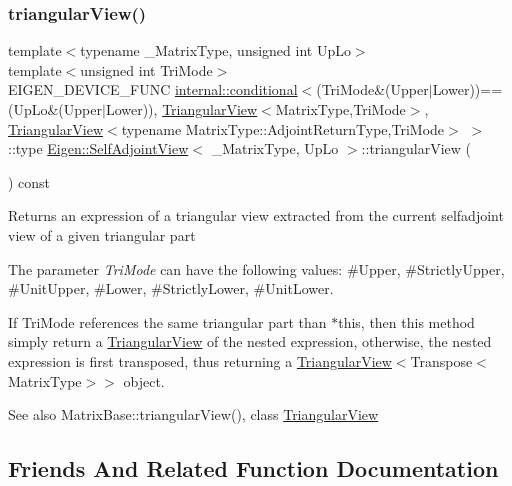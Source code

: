 \subsubsection{\texorpdfstring{triangularView()}{triangularView()}}
{\footnotesize\ttfamily template$<$typename \+\_\+\+Matrix\+Type, unsigned int Up\+Lo$>$ \\
template$<$unsigned int Tri\+Mode$>$ \\
E\+I\+G\+E\+N\+\_\+\+D\+E\+V\+I\+C\+E\+\_\+\+F\+U\+NC \mbox{\hyperlink{struct_eigen_1_1internal_1_1conditional}{internal\+::conditional}}$<$(Tri\+Mode\&(Upper$\vert$Lower))==(Up\+Lo\&(Upper$\vert$Lower)), \mbox{\hyperlink{class_eigen_1_1_triangular_view}{Triangular\+View}}$<$Matrix\+Type,Tri\+Mode$>$, \mbox{\hyperlink{class_eigen_1_1_triangular_view}{Triangular\+View}}$<$typename Matrix\+Type\+::\+Adjoint\+Return\+Type,Tri\+Mode$>$ $>$\+::type \mbox{\hyperlink{class_eigen_1_1_self_adjoint_view}{Eigen\+::\+Self\+Adjoint\+View}}$<$ \+\_\+\+Matrix\+Type, Up\+Lo $>$\+::triangular\+View (\begin{DoxyParamCaption}{ }\end{DoxyParamCaption}) const\hspace{0.3cm}{\ttfamily [inline]}}

\begin{DoxyReturn}{Returns}
an expression of a triangular view extracted from the current selfadjoint view of a given triangular part
\end{DoxyReturn}
The parameter {\itshape Tri\+Mode} can have the following values\+: {\ttfamily \#\+Upper}, {\ttfamily \#\+Strictly\+Upper}, {\ttfamily \#\+Unit\+Upper}, {\ttfamily \#\+Lower}, {\ttfamily \#\+Strictly\+Lower}, {\ttfamily \#\+Unit\+Lower}.

If {\ttfamily Tri\+Mode} references the same triangular part than {\ttfamily $\ast$this}, then this method simply return a {\ttfamily \mbox{\hyperlink{class_eigen_1_1_triangular_view}{Triangular\+View}}} of the nested expression, otherwise, the nested expression is first transposed, thus returning a {\ttfamily \mbox{\hyperlink{class_eigen_1_1_triangular_view}{Triangular\+View}}$<$Transpose$<$\+Matrix\+Type$>$$>$} object.

\begin{DoxySeeAlso}{See also}
Matrix\+Base\+::triangular\+View(), class \mbox{\hyperlink{class_eigen_1_1_triangular_view}{Triangular\+View}} 
\end{DoxySeeAlso}


\subsection{Friends And Related Function Documentation}
\mbox{\label{class_eigen_1_1_self_adjoint_view_a54cb8708758a42bdce22bdf7f5ee890a}} 
